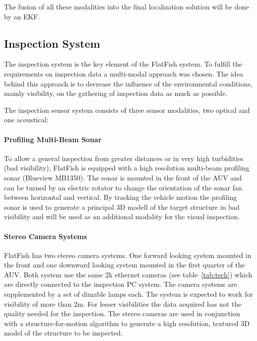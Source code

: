 \documentclass[conference]{IEEEtran}
\begin{document}
The fusion of all these modalities into the final localization solution will be done by an EKF.

\subsection{Inspection System}
\label{sec:insp}

The inspection system is the key element of the FlatFish system. To fulfill the requirements 
on inspection data a multi-modal approach was chosen. The idea behind this approach is 
to decrease the influence of the environmental conditions, mainly visibility, on the gathering 
of inspection data as much as possible.

The inspection sensor system consists of three sensor modalities, two optical and one 
acoustical:
\paragraph*{\textbf{Profiling Multi-Beam Sonar}} To allow a general inspection from greater 
distances or in very high turbidities (bad visibility), FlatFish is equipped with a high resolution 
multi-beam profiling sonar (Blueview MB1350). The sonar is mounted in the front of the AUV 
and can be turned by an electric rotator to change the orientation of the sonar fan between 
horizontal and vertical. By tracking the vehicle motion the profiling sonar is used to generate 
a principal 3D modell of the target structure in bad visibility and will be used as an 
additional modality for the visual inspection.

\paragraph*{\textbf{Stereo Camera Systems}} FlatFish has two stereo camera systems. 
One forward looking system mounted in the front and one downward looking system 
mounted in the first quarter of the AUV. Both system use the same 2k ethernet cameras 
(see table~\ref{tab:tech}) which are directly connected to the inspection PC system. The 
camera systems are supplemented by a set of dimable lamps each. The system is expected 
to work for visibility of more than 2m. For lesser visibilities the data acquired has not the 
quality needed for the inspection. The stereo cameras are used in conjunction with a 
structure-for-motion algorithm to generate a high resolution, textured 3D model of the 
structure to be inspected.
\end{document}
